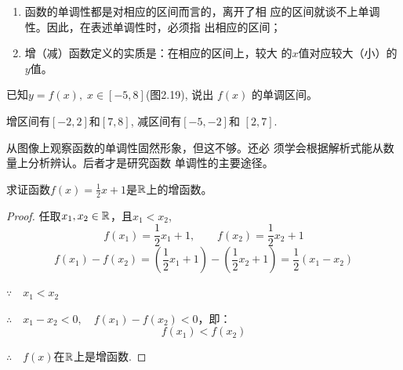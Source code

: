 \begin{note}
\begin{enumerate}
    \item 函数的单调性都是对相应的区间而言的，离开了相
    应的区间就谈不上单调性。因此，在表述单调性时，必须指
    出相应的区间；
    \item 增（减）函数定义的实质是：在相应的区间上，较大
    的$x$值对应较大（小）的$y$值。
\end{enumerate}
\end{note}

\begin{example}
已知$y=f(x),\; x\in[-5,8]$(图2.19), 说出
$f(x)$
的单调区间。
\begin{figure}[htp]
    \centering
{}
    \caption{}
\end{figure}
\end{example}

\begin{solution}
    增区间有$[-2,2]$和$[7,8]$, 减区间有$[-5,-2]$和
$[2,7]$.

从图像上观察函数的单调性固然形象，但这不够。还必
须学会根据解析式能从数量上分析辨认。后者才是研究函数
单调性的主要途径。
\end{solution}

\begin{example}
    求证函数$f(x)=\frac{1}{2}x+1$是$\mathbb{R}$上的增函数。
\end{example}

\begin{proof}
任取$x_1,x_2\in\mathbb{R}$，且$x_1<x_2$,
\[f(x_1)=\frac{1}{2}x_1+1,\qquad f(x_2)=\frac{1}{2}x_2+1\]
\[f(x_1)-f(x_2)=\left(\frac{1}{2}x_1+1\right)-\left(\frac{1}{2}x_2+1\right)=\frac{1}{2}(x_1-x_2)\]

$\because\quad x_1<x_2$

$\therefore\quad x_1-x_2<0,\quad f(x_1)-f(x_2)<0$，即：
\[f(x_1)<f(x_2)\]

$\therefore\quad f(x)$在$\mathbb{R}$上是增函数.
\end{proof}

